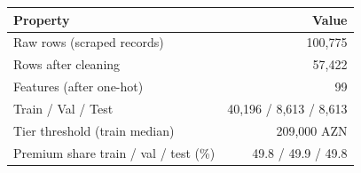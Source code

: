 \begin{tabular}{@{}lr@{}}
\toprule
Property & Value \\
\midrule
Raw rows (scraped records) & 100,775 \\
Rows after cleaning & 57,422 \\
Features (after one-hot) & 99 \\
Train / Val / Test & 40,196 / 8,613 / 8,613 \\
Tier threshold (train median) & 209,000 AZN \\
Premium share train / val / test (\%) & 49.8 / 49.9 / 49.8 \\
\bottomrule
\end{tabular}
